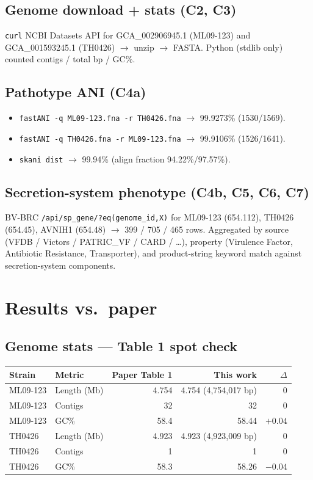 \documentclass[11pt]{article}
\begin{document}
\subsection{Genome download + stats (C2, C3)}
\texttt{curl} NCBI Datasets API for GCA\_002906945.1 (ML09-123) and
GCA\_001593245.1 (TH0426) $\rightarrow$ unzip $\rightarrow$ FASTA. Python
(stdlib only) counted contigs / total bp / GC\%.

\subsection{Pathotype ANI (C4a)}
\begin{itemize}
  \item \texttt{fastANI -q ML09-123.fna -r TH0426.fna} $\rightarrow$ 99.9273\% (1530/1569).
  \item \texttt{fastANI -q TH0426.fna -r ML09-123.fna} $\rightarrow$ 99.9106\% (1526/1641).
  \item \texttt{skani dist} $\rightarrow$ 99.94\% (align fraction 94.22\%/97.57\%).
\end{itemize}

\subsection{Secretion-system phenotype (C4b, C5, C6, C7)}
BV-BRC \texttt{/api/sp\_gene/?eq(genome\_id,X)} for ML09-123 (654.112),
TH0426 (654.45), AVNIH1 (654.48) $\rightarrow$ 399 / 705 / 465 rows.
Aggregated by source (VFDB / Victors / PATRIC\_VF / CARD / \ldots), property
(Virulence Factor, Antibiotic Resistance, Transporter), and product-string
keyword match against secretion-system components.

\section{Results vs.\ paper}

\subsection{Genome stats --- Table 1 spot check}
\begin{center}
\begin{tabular}{@{}llrrr@{}}
\toprule
Strain & Metric & Paper Table 1 & This work & $\Delta$ \\
\midrule
ML09-123 & Length (Mb)  & 4.754 & 4.754 (4{,}754{,}017 bp) & 0 \\
ML09-123 & Contigs      & 32    & 32                       & 0 \\
ML09-123 & GC\%         & 58.4  & 58.44                    & $+0.04$ \\
TH0426   & Length (Mb)  & 4.923 & 4.923 (4{,}923{,}009 bp) & 0 \\
TH0426   & Contigs      & 1     & 1                        & 0 \\
TH0426   & GC\%         & 58.3  & 58.26                    & $-0.04$ \\
\bottomrule
\end{tabular}
\end{center}
\end{document}
